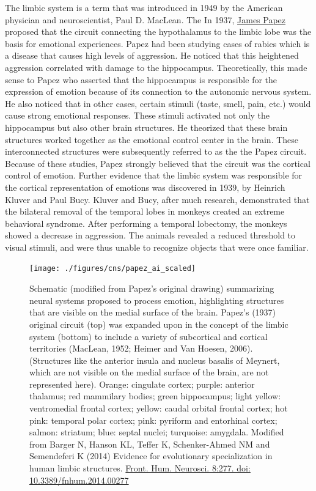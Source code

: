 The limbic system is a term that was introduced in 1949 by the American physician and neuroscientist, Paul D. MacLean. The In 1937, \href{https://en.wikipedia.org/wiki/James_Papez}{James Papez} proposed that the circuit connecting the hypothalamus to the limbic lobe was the basis for emotional experiences. Papez had been studying cases of rabies which is a disease that causes high levels of aggression. He noticed that this heightened aggression correlated with damage to the hippocampus. Theoretically, this made sense to Papez who asserted that the hippocampus is responsible for the expression of emotion because of its connection to the autonomic nervous system. He also noticed that in other cases, certain stimuli (taste, smell, pain, etc.) would cause strong emotional responses. These stimuli activated not only the hippocampus but also other brain structures. He theorized that these brain structures worked together as the emotional control center in the brain. These interconnected structures were subsequently referred to as the the Papez circuit. Because of these studies, Papez strongly believed that the circuit was the cortical control of emotion. Further evidence that the limbic system was responsible for the cortical representation of emotions was discovered in 1939, by Heinrich Kluver and Paul Bucy. Kluver and Bucy, after much research, demonstrated that the bilateral removal of the temporal lobes in monkeys created an extreme behavioral syndrome. After performing a temporal lobectomy, the monkeys showed a decrease in aggression. The animals revealed a reduced threshold to visual stimuli, and were thus unable to recognize objects that were once familiar.



\begin{figure}

{\centering \texttt{[image: ./figures/cns/papez\_ai\_scaled]} 

}

\caption{Schematic (modified from Papez's original drawing) summarizing neural systems proposed to process emotion, highlighting structures that are visible on the medial surface of the brain. Papez's (1937) original circuit (top) was expanded upon in the concept of the limbic system (bottom) to include a variety of subcortical and cortical territories (MacLean, 1952; Heimer and Van Hoesen, 2006). (Structures like the anterior insula and nucleus basalis of Meynert, which are not visible on the medial surface of the brain, are not represented here). Orange: cingulate cortex; purple: anterior thalamus; red mammilary bodies; green hippocampus; light yellow: ventromedial frontal cortex; yellow: caudal orbital frontal cortex; hot pink: temporal polar cortex; pink: pyriform and entorhinal cortex; salmon: striatum; blue: septal nuclei; turquoise: amygdala. Modified from Barger N, Hanson KL, Teffer K, Schenker-Ahmed NM and Semendeferi K (2014) Evidence for evolutionary specialization in human limbic structures. \href{http://journal.frontiersin.org/article/10.3389/fnhum.2014.00277/full}{Front. Hum. Neurosci. 8:277. doi: 10.3389/fnhum.2014.00277}}\label{fig:papezcircuit}
\end{figure}

